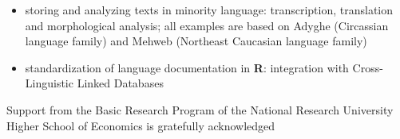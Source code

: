 \documentclass[\main/boa.tex]{subfiles}
\begin{document}
\begin{itemize}
\tightlist
\item
  storing and analyzing texts in minority language: transcription,
  translation and morphological analysis; all examples are based on
  Adyghe (Circassian language family) and Mehweb (Northeast Caucasian
  language family)
\item
  standardization of language documentation in \textbf{R}: integration
  with Cross-Linguistic Linked Databases
\end{itemize}

Support from the Basic Research Program of the National Research
University Higher School of Economics is gratefully acknowledged
\end{document}

